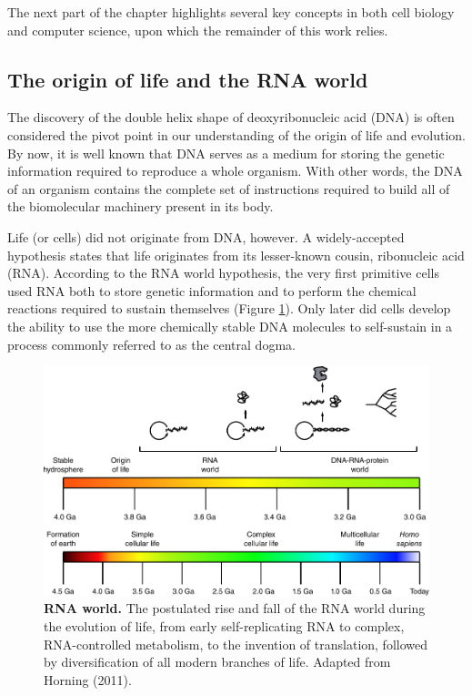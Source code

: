 The next part of the chapter highlights several key concepts in both cell biology and computer science, upon which the remainder of this work relies.

\subsection{The origin of life and the RNA world}
The discovery of the double helix shape of deoxyribonucleic acid (DNA)\cite{watson_molecularstructurenucleic_1953} is often considered the pivot point in our understanding of the origin of life and evolution. By now, it is well known that DNA serves as a medium for storing the genetic information required to reproduce a whole organism. With other words, the DNA of an organism contains the complete set of instructions required to build all of the biomolecular machinery present in its body. 

Life (or cells) did not originate from DNA, however. A widely-accepted hypothesis states that life originates from its lesser-known cousin, ribonucleic acid (RNA). According to the RNA world hypothesis\cite{alberts_rnaworldorigins_2002}, the very first primitive cells used RNA both to store genetic information and to perform the chemical reactions required to sustain themselves (Figure \ref{fig:rnaworld}). Only later did cells develop the ability to use the more chemically stable DNA molecules to self-sustain in a process commonly referred to as the central dogma.

\begin{figure}[htb!]
	\centering
	\includegraphics[width=.8\linewidth]{fig/rnaworld}
	\caption{
		\textbf{RNA world.} The postulated rise and fall of the RNA world during the evolution of life, from early self-replicating RNA to complex, RNA-controlled metabolism, to the invention of translation, followed by diversification of all modern branches of life. Adapted from Horning (2011)\cite{horning_rnaworld_2011}.
	}
	\label{fig:rnaworld}
\end{figure}

